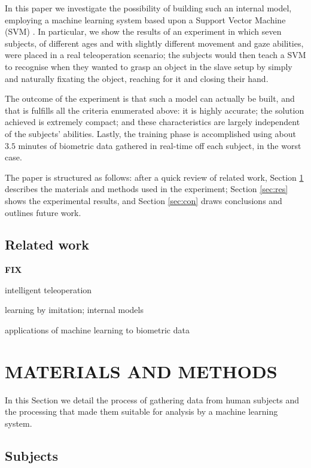 \documentclass[a4paper,10pt,conference]{ieeeconf}
\begin{document}
In this paper we investigate the possibility of building such an
internal model, employing a machine learning system based upon a
Support Vector Machine (SVM) \cite{BGV92}. In particular, we show the
results of an experiment in which seven subjects, of different ages
and with slightly different movement and gaze abilities, were placed
in a real teleoperation scenario; the subjects would then teach a SVM
to recognise when they wanted to grasp an object in the slave setup by
simply and naturally fixating the object, reaching for it and closing
their hand.

The outcome of the experiment is that such a model can actually be
built, and that is fulfills all the criteria enumerated above: it is
highly accurate; the solution achieved is extremely compact; and these
characteristics are largely independent of the subjects'
abilities. Lastly, the training phase is accomplished using about
$3.5$ minutes of biometric data gathered in real-time off each
subject, in the worst case.

The paper is structured as follows: after a quick review of related
work, Section \ref{sec:mat} describes the materials and methods used
in the experiment; Section \ref{sec:res} shows the experimental
results, and Section \ref{sec:con} draws conclusions and outlines
future work.

\subsection{Related work}

{\bf FIX}

intelligent teleoperation

learning by imitation; internal models

applications of machine learning to biometric data

\section{MATERIALS AND METHODS}
\label{sec:mat}

In this Section we detail the process of gathering data from human
subjects and the processing that made them suitable for analysis by a
machine learning system.

\subsection{Subjects}
\end{document}
